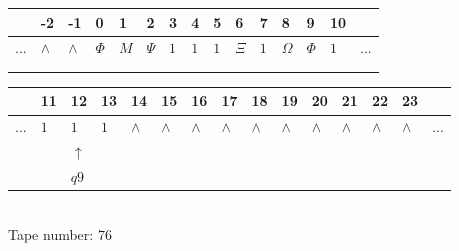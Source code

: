 \documentclass[11pt]{article}
\begin{document}
\begin{table}[H]
\centering
\begin{tabular}{lllllllllllllll}
 & -2 & -1 & 0 & 1 & 2 & 3 & 4 & 5 & 6 & 7 & 8 & 9 & 10 & \\
\hline
$...$ & \multicolumn{1}{|l|}{$\wedge$} & \multicolumn{1}{|l|}{$\wedge$} & \multicolumn{1}{|l|}{$\Phi$} & \multicolumn{1}{|l|}{$M$} & \multicolumn{1}{|l|}{$\Psi$} & \multicolumn{1}{|l|}{$1$} & \multicolumn{1}{|l|}{$1$} & \multicolumn{1}{|l|}{$1$} & \multicolumn{1}{|l|}{$\Xi$} & \multicolumn{1}{|l|}{$1$} & \multicolumn{1}{|l|}{$\Omega$} & \multicolumn{1}{|l|}{$\Phi$} & \multicolumn{1}{|l|}{$1$} & $...$\\
\hline
&  &  &  &  &  &  &  &  &  &  &  &  &  &  \\
&  &  &  &  &  &  &  &  &  &  &  &  &  &  \\
\end{tabular}
\begin{tabular}{lllllllllllllll}
 & 11 & 12 & 13 & 14 & 15 & 16 & 17 & 18 & 19 & 20 & 21 & 22 & 23 & \\
\hline
$...$ & \multicolumn{1}{|l|}{$1$} & \multicolumn{1}{|l|}{$1$} & \multicolumn{1}{|l|}{$1$} & \multicolumn{1}{|l|}{$\wedge$} & \multicolumn{1}{|l|}{$\wedge$} & \multicolumn{1}{|l|}{$\wedge$} & \multicolumn{1}{|l|}{$\wedge$} & \multicolumn{1}{|l|}{$\wedge$} & \multicolumn{1}{|l|}{$\wedge$} & \multicolumn{1}{|l|}{$\wedge$} & \multicolumn{1}{|l|}{$\wedge$} & \multicolumn{1}{|l|}{$\wedge$} & \multicolumn{1}{|l|}{$\wedge$} & $...$\\
\hline
&  & $\uparrow$ &  &  &  &  &  &  &  &  &  &  &  &  \\
&  & $ q9 $ &  &  &  &  &  &  &  &  &  &  &  &  \\
\end{tabular}
\\
Tape number: 76
\noindent\makebox[\linewidth]{\hdashrule{\textwidth}{1pt}{1pt}}\end{table}
\end{document}
